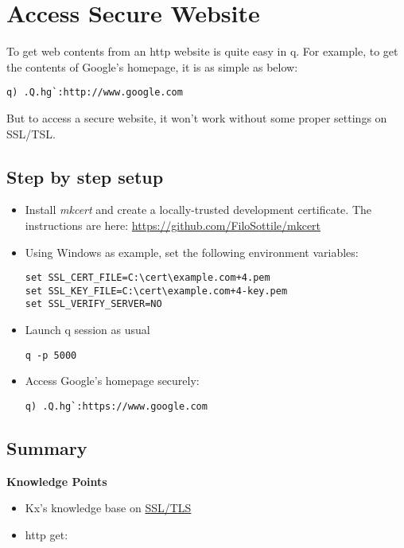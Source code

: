 \section{Access Secure Website}

To get web contents from an http website is quite easy in q. For example, to get the contents of Google's homepage, it is as simple as below:

\begin{verbatim}
q) .Q.hg`:http://www.google.com
\end{verbatim}

But to access a secure website, it won't work without some proper settings on SSL/TSL.

\subsection{Step by step setup}
\begin{itemize}
\item Install \emph{mkcert} and create a locally-trusted development certificate. The instructions are here: \href{https://github.com/FiloSottile/mkcert}{https://github.com/FiloSottile/mkcert}
\item Using Windows as example, set the following environment variables:
\begin{verbatim}
set SSL_CERT_FILE=C:\cert\example.com+4.pem
set SSL_KEY_FILE=C:\cert\example.com+4-key.pem
set SSL_VERIFY_SERVER=NO
\end{verbatim}
\item Launch q session as usual
\begin{verbatim}
q -p 5000
\end{verbatim}

\item Access Google's homepage securely:
\begin{verbatim}
q) .Q.hg`:https://www.google.com
\end{verbatim}
\end{itemize}

\subsection{Summary}

\begin{noteblock}
\textbf{Knowledge Points}
\begin{itemize}
\item Kx's knowledge base on \href{https://code.kx.com/q/kb/ssl/}{SSL/TLS}
\item http get: \href{https://code.kx.com/q/ref/dotq/#qhg-http-get}{}
\end{itemize}
\end{noteblock}

\clearpage
